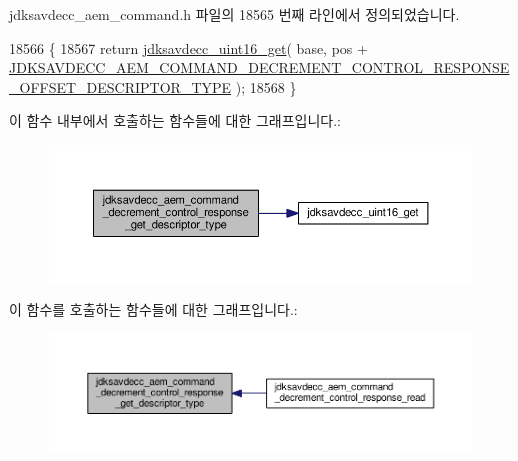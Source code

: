 jdksavdecc\+\_\+aem\+\_\+command.\+h 파일의 18565 번째 라인에서 정의되었습니다.


\begin{DoxyCode}
18566 \{
18567     \textcolor{keywordflow}{return} \hyperlink{group__endian_ga3fbbbc20be954aa61e039872965b0dc9}{jdksavdecc\_uint16\_get}( base, pos + 
      \hyperlink{group__command__decrement__control__response_gaf3e4791b7da2318cf80405887a7af8c6}{JDKSAVDECC\_AEM\_COMMAND\_DECREMENT\_CONTROL\_RESPONSE\_OFFSET\_DESCRIPTOR\_TYPE}
       );
18568 \}
\end{DoxyCode}


이 함수 내부에서 호출하는 함수들에 대한 그래프입니다.\+:
\nopagebreak
\begin{figure}[H]
\begin{center}
\leavevmode
\includegraphics[width=350pt]{group__command__decrement__control__response_gaea997c36ccd7f65a1caf72de36461c6d_cgraph}
\end{center}
\end{figure}




이 함수를 호출하는 함수들에 대한 그래프입니다.\+:
\nopagebreak
\begin{figure}[H]
\begin{center}
\leavevmode
\includegraphics[width=350pt]{group__command__decrement__control__response_gaea997c36ccd7f65a1caf72de36461c6d_icgraph}
\end{center}
\end{figure}


